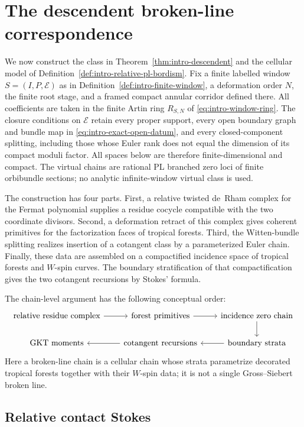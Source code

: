 \section{The descendent broken-line correspondence}
\label{sec:descendent-correspondence}

We now construct the class in
Theorem~\ref{thm:intro-descendent} and the cellular model of
Definition~\ref{def:intro-relative-pl-bordism}.  Fix a finite labelled window
$S=(I,P,\mathcal E)$ as in
Definition~\ref{def:intro-finite-window}, a deformation order $N$, the finite
root stage, and a framed compact annular corridor defined there.  All coefficients are
taken in the finite Artin ring $R_{S,N}$ of
\eqref{eq:intro-window-ring}.  The closure conditions on $\mathcal E$ retain
every proper support, every open boundary graph and bundle map in
\eqref{eq:intro-exact-open-datum}, and every closed-component splitting,
including those whose Euler rank does not equal the dimension of its compact
moduli factor.
All spaces below are therefore finite-dimensional and compact.  The virtual
chains are rational PL branched zero loci of finite orbibundle sections; no
analytic infinite-window virtual class is used.

The construction has four parts.  First, a relative twisted de~Rham complex
for the Fermat polynomial supplies a residue cocycle compatible with the two
coordinate divisors.  Second, a deformation retract of this complex gives
coherent primitives for the factorization faces of tropical forests.  Third,
the Witten-bundle splitting realizes insertion of a cotangent class by a
parameterized Euler chain.  Finally, these data are assembled on a compactified
incidence space of tropical forests and $W$-spin curves.  The boundary
stratification of that compactification gives the two cotangent recursions by
Stokes' formula.

The chain-level argument has the following conceptual order:
\[
\begin{tikzcd}[column sep=2.0em,row sep=1.7em]
\text{relative residue complex}\arrow[r] &
\text{forest primitives}\arrow[r] &
\text{incidence zero chain}\arrow[d] \\
\text{GKT moments} &
\text{cotangent recursions}\arrow[l] &
\text{boundary strata}\arrow[l]
\end{tikzcd}
\]
Here a broken-line chain is a cellular chain whose strata parametrize
decorated tropical forests together with their $W$-spin data; it is not a
single Gross--Siebert broken line.

\subsection{Relative contact Stokes}

